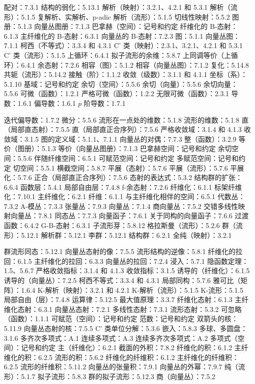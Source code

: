 
配对：7.3.1 结构的弱化：5.13.1 解析（映射）：3.2.1、4.2.1 和 5.3.1 解析（流形）：5.1.5 复解析、实解析、p-adic 解析（流形）：5.1.5 切线性映射：5.5.2 图册：5.1.3 向量丛图册：7.1.3 巴拿赫（空间）：记号和约定 纤维化的 B-态射：6.1.3 主纤维化的 B-态射：6.3.1 向量丛的 B-态射：7.2.3 图：5.1.1 向量丛图：7.1.1 柯西（不等式）：3.3.4 和 4.3.1 C' 类（映射）：2.3.1、3.2.1、4.2.1 和 5.3.1 C' 类（流形）：5.1.5 上循环：6.4.1 拟子流形的余维：5.8.7 上同调等价（上循环）：6.4.1 余态射：7.2.6 相容（图）：5.1.2 相容（向量丛图）：7.1.2 复化：5.14.8 共轭（流形）：5.14.2 接触（阶）：1.1.2 收敛（级数）：3.1.1 和 4.1.1 坐标（系）：5.1.10 基域：记号和约定 余切（空间）：5.5.6 余切（向量）：5.5.6 余切向量：5.5.6 可微（函数）：1.2.1 严格可微（函数）：1.2.2 无限可微（函数）：2.3.1 导数：1.6.1 偏导数：1.6.1 \(p\) 阶导数：1.7.1

迭代偏导数：1.7.2 微分：5.5.6 流形在一点处的维数：5.1.8 流形的维数：5.1.8 直（局部直态射）：7.5.5 直（局部直正合序列）：7.5.6 严格收敛域：3.1.4 和 4.1.3 收敛域：3.1.5 图的定义域：5.1.1、7.1.1 向量丛的对偶：7.7.3 整（函数）：3.2.9 等价（图册）：5.1.3 等价（向量丛图册）：7.1.3 巴拿赫空间：记号和约定 余切空间：5.5.6 伴随纤维空间：6.5.1 可赋范空间：记号和约定 多赋范空间：记号和约定 切空间：5.5.1 横截空间：5.8.7 平展（态射）：5.7.6 平展（流形）：5.7.6 平展化：5.7.6 正合（局部直正合序列）：7.5.6 态射的表达式：5.3.2 结构群的扩张：6.6.4 函数层：5.4.1 局部自由层：7.4.8 f-余态射：7.2.6 纤维化：6.1.1 标架纤维化：7.10.1 主纤维化：6.2.1 纤维：6.1.1 与主纤维化相伴的空间：6.5.1 代数丛：7.3.2 A-模丛：7.3.3 张量丛：7.9.3 向量丛：7.1.4 商向量丛：7.5.2 交错多线性映射向量丛：7.8.1 同态丛：7.7.3 向量函子：7.6.1 关于同构的向量函子：7.6.6 过渡函数：6.4.2 G-B-态射：6.3.1 子流形芽：5.8.12 格拉斯曼（流形）：5.2.6 群（流形）：5.12.1 解析群：5.12.1 李群：5.12.1 结构群：6.2.1 全纯（映射）：3.2.1

群流形同态：5.12.1 向量丛态射的像：7.5.5 流形结构的逆像：5.8.1 纤维化的拉回：6.1.5 主纤维化的拉回：6.3.3 向量丛的拉回：7.2.4 浸入：5.7.1 隐函数定理：1.5、5.6.7 严格收敛指标：3.1.4 和 4.1.3 收敛指标：3.1.5 诱导的（纤维化）：6.1.5 诱导的（向量丛）：7.2.5 柯西不等式：3.3.4 和 4.3.1 局部同构：5.7.6 雅可比（矩阵）：1.6.4 K-解析（映射）：3.2.1 和 4.2.1 K-解析（流形）：5.1.5 K-流形：5.1.5 局部自由（层）：7.4.8 运算律：5.12.5 最大值原理：3.3.7 纤维化态射：6.1.3 主纤维化态射：6.3.1 向量丛态射：7.2.1 多线性态射：7.3.1 流形态射：5.3.2 可忽略（函数）：1.1.1 可赋范（空间）：记号和约定 范数：记号和约定 双箭头的核：5.11.9 向量丛态射的核：7.5.5 C' 类单位分解：5.3.6 嵌入：5.8.3 多球、多圆盘：3.1.6 多齐次多项式：A.1 连续多项式：A.3 连续多齐次多项式：A.2 多项式（空间）：记号和约定 主（纤维化）：6.2.1 截面的外积：7.8.2 纤维化的积：6.1.2 主纤维化的积：6.2.5 流形的积：5.6.2 纤维化的纤维积：6.1.2 主纤维化的纤维积：6.2.5 流形的纤维积：5.11.2 向量丛的张量积：7.9.1 向量丛的外幂：7.9.7 纯（流形）：5.1.7 拟子流形：5.8.3 群的拟子流形：5.12.3 商（向量丛）：7.5.2

